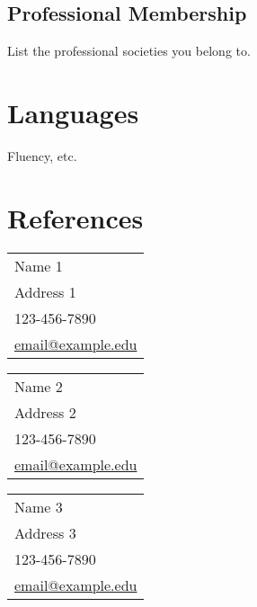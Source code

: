 \documentclass[12pt]{safecv}%
\begin{document}
\subsection*{Professional Membership}
List the professional societies you belong to.

\section*{Languages}
\begin{description}[noitemsep]
\item[Language:] Fluency, etc.
\end{description}

\section*{References}

\begin{itemize*}
\item
\begin{tabular}{@{}l}
  Name 1                  \\
  Address 1               \\
  123-456-7890            \\
  \url{email@example.edu}
\end{tabular}
\item 
\begin{tabular}{l}
  Name 2                  \\
  Address 2               \\
  123-456-7890            \\
  \url{email@example.edu}
\end{tabular}
\item 
\begin{tabular}{l}
  Name 3                  \\
  Address 3               \\
  123-456-7890            \\
  \url{email@example.edu}
\end{tabular}
\end{itemize*}
\end{document}
